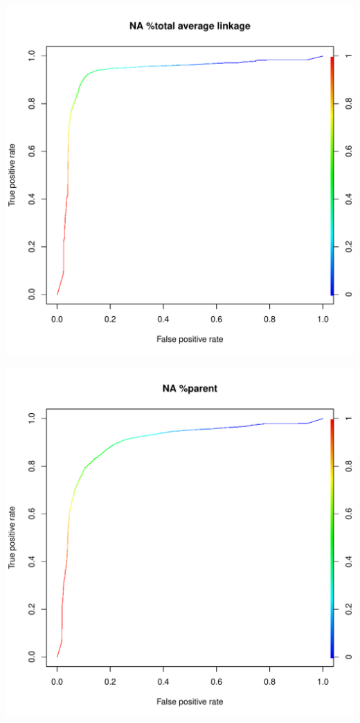 \documentclass[11pt,a4paper,twoside]{report}\usepackage[]{graphicx}\usepackage[]{color}
\makeatletter
\def\maxwidth{ %
  \ifdim\Gin@nat@width>\linewidth
    \linewidth
  \else
    \Gin@nat@width
  \fi
}
\newenvironment{knitrout}{}{} %
\makeatother
\begin{document}
\begin{knitrout}
\includegraphics[width=\maxwidth]{figure/fig_code-35} 

\includegraphics[width=\maxwidth]{figure/fig_code-36} 
\end{knitrout}
\end{document}
